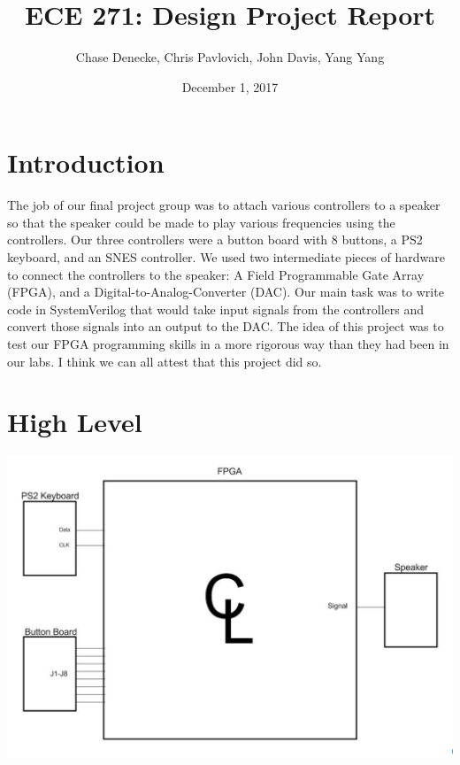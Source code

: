 \documentclass[a4paper]{article}
\title{ECE 271: Design Project Report}
\author{Chase Denecke, Chris Pavlovich, John Davis, Yang Yang}
\date{December 1, 2017}
\begin{document}
\maketitle

\section{Introduction}
The job of our final project group was to attach various controllers to a speaker so that the speaker could be made to play various frequencies using the controllers. Our three controllers were a button board with 8 buttons, a PS2 keyboard, and an SNES controller. We used two intermediate pieces of hardware to connect the controllers to the speaker: A Field Programmable Gate Array (FPGA), and a Digital-to-Analog-Converter (DAC). Our main task was to write code in SystemVerilog that would take input signals from the controllers and convert those signals into an output to the DAC.
\newline\newline
The idea of this project was to test our FPGA programming skills in a more rigorous way than they had been in our labs. I think we can all attest that this project did so.  


\section{High Level}


    \includegraphics[width=6 in]{./Images/jackPictures/highLevel.png}
\end{document}
